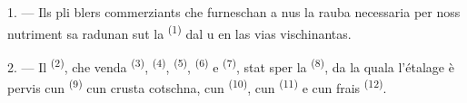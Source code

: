 %
%
%
%
%
%

\VUsaut{4.0mm}
\VUsaut{3.0mm}

\VUsaut{3.0mm}

1. --- Ils pli blers commerziants che furneschan a nus la rauba necessaria per noss
nutriment sa radunan sut la  \textsuperscript{(1)} dal  u
en
las vias vischinantas.

2. --- Il  \textsuperscript{(2)}, che venda 
\textsuperscript{(3)},  \textsuperscript{(4)}, 
\textsuperscript{(5)},  \textsuperscript{(6)} e 
\textsuperscript{(7)}, stat sper la 
\textsuperscript{(8)}, da la quala l'étalage è pervis cun 
\textsuperscript{(9)} cun crusta cotschna, cun 
\textsuperscript{(10)}, cun  \textsuperscript{(11)} e cun frais
 \textsuperscript{(12)}.

